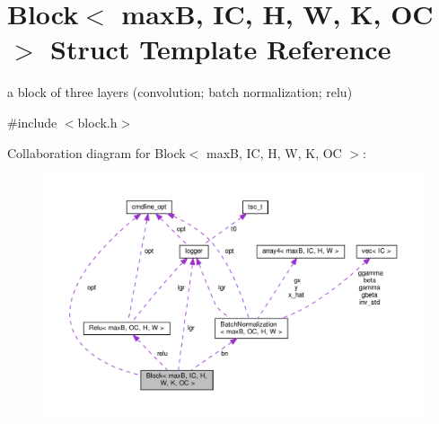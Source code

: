 \hypertarget{structBlock}{}\section{Block$<$ maxB, IC, H, W, K, OC $>$ Struct Template Reference}
\label{structBlock}


a block of three layers (convolution; batch normalization; relu)  




{\ttfamily \#include $<$block.\+h$>$}



Collaboration diagram for Block$<$ maxB, IC, H, W, K, OC $>$\+:
\nopagebreak
\begin{figure}[H]
\begin{center}
\leavevmode
\includegraphics[width=350pt]{structBlock__coll__graph}
\end{center}
\end{figure}
